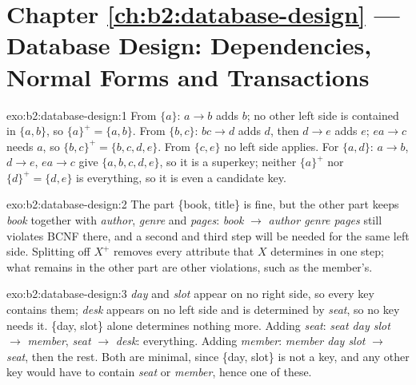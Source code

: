 \section*{Chapter \ref{ch:b2:database-design} --- Database Design: Dependencies, Normal Forms and Transactions}

\begin{solution}{exo:b2:database-design:1}
From $\{a\}$: $a \to b$ adds $b$; no other left side is contained in $\{a, b\}$, so $\{a\}^+ = \{a, b\}$. From $\{b, c\}$:
$bc \to d$ adds $d$, then $d \to e$ adds $e$; $ea \to c$ needs $a$, so $\{b, c\}^+ = \{b, c, d, e\}$. From $\{c, e\}$ no
left side applies. For $\{a, d\}$: $a \to b$, $d \to e$, $ea \to c$ give $\{a, b, c, d, e\}$, so it is a superkey; neither
$\{a\}^+$ nor $\{d\}^+ = \{d, e\}$ is everything, so it is even a candidate key.

\end{solution}

\begin{solution}{exo:b2:database-design:2}
The part \{book, title\} is fine, but the other part keeps \emph{book} together with \emph{author}, \emph{genre} and
\emph{pages}: \emph{book} $\to$ \emph{author genre pages} still violates BCNF there, and a second and third step will be
needed for the same left side. Splitting off $X^+$ removes every attribute that $X$ determines in one step; what remains
in the other part are other violations, such as the member's.
\end{solution}

\begin{solution}{exo:b2:database-design:3}
\emph{day} and \emph{slot} appear on no right side, so every key contains them; \emph{desk} appears on no left side and is
determined by \emph{seat}, so no key needs it. \{day, slot\} alone determines nothing more.
Adding \emph{seat}: \emph{seat day slot} $\to$ \emph{member}, \emph{seat} $\to$ \emph{desk}: everything. Adding
\emph{member}: \emph{member day slot} $\to$ \emph{seat}, then the rest. Both are minimal, since \{day, slot\} is not a key,
and any other key would have to contain \emph{seat} or \emph{member}, hence one of these.

\end{solution}

